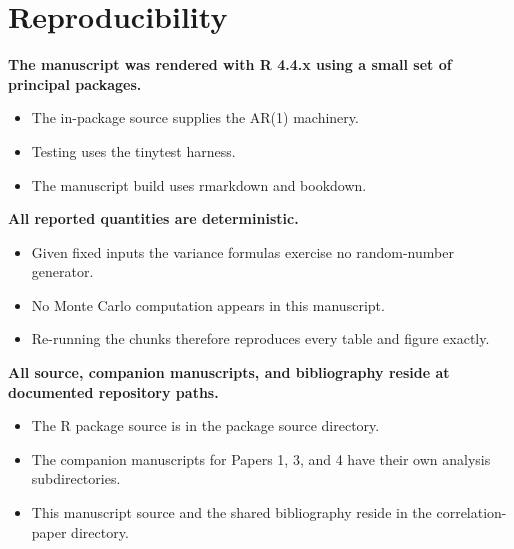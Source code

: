 \documentclass[
  11pt,
]{article}
\begin{document}
\section{Reproducibility}\label{reproducibility}

\textbf{The manuscript was rendered with R 4.4.x using a small set of principal packages.}

\begin{itemize}\setlength{\itemsep}{2pt}\setlength{\parskip}{0pt}
\item The in-package source supplies the AR(1) machinery.
\item Testing uses the tinytest harness.
\item The manuscript build uses rmarkdown and bookdown.
\end{itemize}

\textbf{All reported quantities are deterministic.}

\begin{itemize}\setlength{\itemsep}{2pt}\setlength{\parskip}{0pt}
\item Given fixed inputs the variance formulas exercise no random-number generator.
\item No Monte Carlo computation appears in this manuscript.
\item Re-running the chunks therefore reproduces every table and figure exactly.
\end{itemize}

\textbf{All source, companion manuscripts, and bibliography reside at documented repository paths.}

\begin{itemize}\setlength{\itemsep}{2pt}\setlength{\parskip}{0pt}
\item The R package source is in the package source directory.
\item The companion manuscripts for Papers 1, 3, and 4 have their own analysis subdirectories.
\item This manuscript source and the shared bibliography reside in the correlation-paper directory.
\end{itemize}
\end{document}
